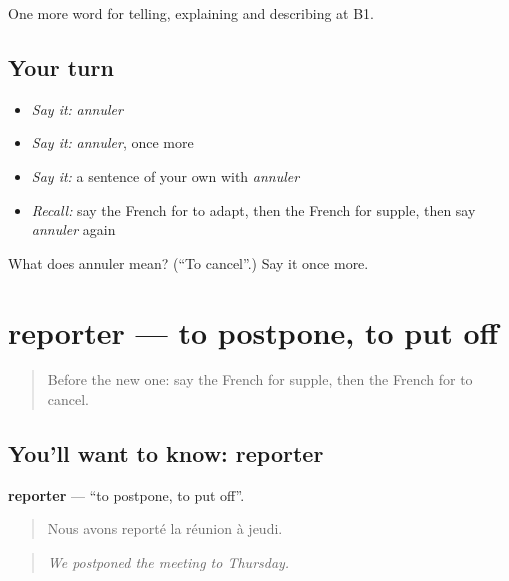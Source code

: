 \begin{grammarlens}[title={What you've built}]
One more word for telling, explaining and describing at B1.
\end{grammarlens}

\subsection*{Your turn}
\begin{itemize}
\raggedright
  \item \emph{Say it:} \emph{annuler}
  \item \emph{Say it:} \emph{annuler}, once more
  \item \emph{Say it:} a sentence of your own with \emph{annuler}
  \item \emph{Recall:} say the French for to adapt, then the French for supple, then say \emph{annuler} again
\end{itemize}

\begin{tcolorbox}[breakable,colback=teal!4,colframe=teal!35!black,title={Before you move on}]
What does annuler mean? (\textquotedblleft{}To cancel\textquotedblright{}.) Say it once more.
\end{tcolorbox}
\section[reporter]{reporter — to postpone, to put off}

\label{lesson:FR-C371-reporter}



\begin{quote}
Before the new one: say the French for supple, then the French for to cancel.
\end{quote}

\subsection*{You'll want to know: reporter}
\textbf{reporter} — \textquotedblleft{}to postpone, to put off\textquotedblright{}.

\begin{quote}
Nous avons reporté la réunion à jeudi.
\end{quote}

\begin{quote}
\emph{We postponed the meeting to Thursday.}
\end{quote}

